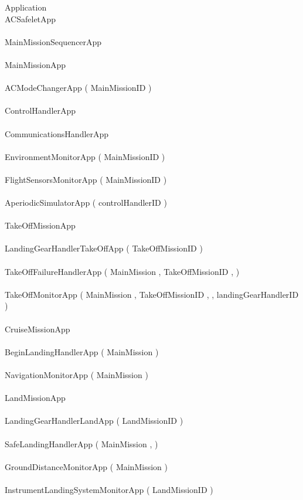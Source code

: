 \begin{circus}
\circprocess  Application \circdef \\
\circblockopen
ACSafeletApp\\
\interleave\\
MainMissionSequencerApp\\
\interleave \\
		MainMissionApp\\
		\interleave \\
			ACModeChangerApp ( MainMissionID  ) \\
			\interleave \\
			ControlHandlerApp\\
			\interleave \\
			CommunicationsHandlerApp\\
			\interleave \\
			EnvironmentMonitorApp ( MainMissionID  ) \\
			\interleave \\
			FlightSensorsMonitorApp ( MainMissionID  ) \\
			\interleave \\
			AperiodicSimulatorApp ( controlHandlerID  ) \\
			
		
		\interleave \\
		TakeOffMissionApp\\
		\interleave \\
			LandingGearHandlerTakeOffApp ( TakeOffMissionID  ) \\
			\interleave \\
			TakeOffFailureHandlerApp ( MainMission ,  TakeOffMissionID ,    ) \\
			\interleave \\
			TakeOffMonitorApp ( MainMission ,  TakeOffMissionID ,   ,  landingGearHandlerID  ) \\
			
		\interleave \\
		CruiseMissionApp\\
		\interleave \\
			BeginLandingHandlerApp ( MainMission  ) \\
			\interleave \\
			NavigationMonitorApp ( MainMission  ) \\
			
		\interleave \\
		LandMissionApp\\
		\interleave \\
			LandingGearHandlerLandApp ( LandMissionID  ) \\
			\interleave \\
			SafeLandingHandlerApp ( MainMission ,    ) \\
			\interleave \\
			GroundDistanceMonitorApp ( MainMission  ) \\
			\interleave \\
			InstrumentLandingSystemMonitorApp ( LandMissionID  ) \\
			
		
\circblockclose
\end{circus}
